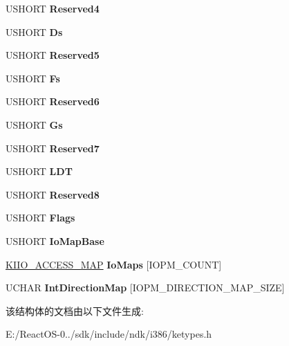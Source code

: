\begin{DoxyCompactItemize}
U\+S\+H\+O\+RT {\bfseries Reserved4}
\item 
\mbox{\label{struct___k_t_s_s_a23420c341a3e80f0addc5317e6d6a7da}} 
U\+S\+H\+O\+RT {\bfseries Ds}
\item 
\mbox{\label{struct___k_t_s_s_a2708df898cb263ab1edd83fbb4a2a613}} 
U\+S\+H\+O\+RT {\bfseries Reserved5}
\item 
\mbox{\label{struct___k_t_s_s_a01620c6d2078f4cdb9818c18e4590526}} 
U\+S\+H\+O\+RT {\bfseries Fs}
\item 
\mbox{\label{struct___k_t_s_s_afafbd5ad10f486a48fafcfba4e469643}} 
U\+S\+H\+O\+RT {\bfseries Reserved6}
\item 
\mbox{\label{struct___k_t_s_s_a8a5b0d3f484f3458d802b895f7e1204a}} 
U\+S\+H\+O\+RT {\bfseries Gs}
\item 
\mbox{\label{struct___k_t_s_s_ac636d183c341735069bcfc8379999b79}} 
U\+S\+H\+O\+RT {\bfseries Reserved7}
\item 
\mbox{\label{struct___k_t_s_s_a0b0baa790e0597f81396f242e70b6db7}} 
U\+S\+H\+O\+RT {\bfseries L\+DT}
\item 
\mbox{\label{struct___k_t_s_s_a93192c1a7bb49fd390e78a41107d8a76}} 
U\+S\+H\+O\+RT {\bfseries Reserved8}
\item 
\mbox{\label{struct___k_t_s_s_a17342d1f1207e322a84ab4467edb4d3d}} 
U\+S\+H\+O\+RT {\bfseries Flags}
\item 
\mbox{\label{struct___k_t_s_s_ab35f733fc3b59253c748ae27aacf2941}} 
U\+S\+H\+O\+RT {\bfseries Io\+Map\+Base}
\item 
\mbox{\label{struct___k_t_s_s_a4e7911e4a4579418225d6ded4f8e47d7}} 
\hyperlink{struct___ki_io_access_map}{K\+I\+I\+O\+\_\+\+A\+C\+C\+E\+S\+S\+\_\+\+M\+AP} {\bfseries Io\+Maps} \mbox{[}I\+O\+P\+M\+\_\+\+C\+O\+U\+NT\mbox{]}
\item 
\mbox{\label{struct___k_t_s_s_a404379323f6af5c5cf0a2a784dce0a90}} 
U\+C\+H\+AR {\bfseries Int\+Direction\+Map} \mbox{[}I\+O\+P\+M\+\_\+\+D\+I\+R\+E\+C\+T\+I\+O\+N\+\_\+\+M\+A\+P\+\_\+\+S\+I\+ZE\mbox{]}
\end{DoxyCompactItemize}


该结构体的文档由以下文件生成\+:\begin{DoxyCompactItemize}
\item 
E\+:/\+React\+O\+S-\/0../sdk/include/ndk/i386/ketypes.\+h\end{DoxyCompactItemize}
